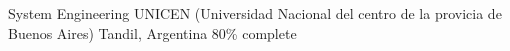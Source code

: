 \begin{cventries}
\cventry
{System Engineering} %
{UNICEN (Universidad Nacional del centro de la provicia de Buenos Aires)} %
{Tandil, Argentina} %
{ 80\% complete} %
{ %
}
\end{cventries}
